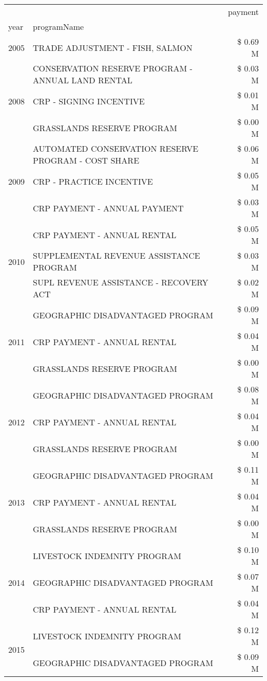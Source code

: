 \begin{tabular}{llr}
\toprule
 &  & payment \\
year & programName &  \\
\midrule
2005 & TRADE ADJUSTMENT - FISH, SALMON & \$ 0.69 M \\
\cline{1-3}
\multirow[t]{3}{*}{2008} & CONSERVATION RESERVE PROGRAM - ANNUAL LAND RENTAL & \$ 0.03 M \\
 & CRP - SIGNING INCENTIVE & \$ 0.01 M \\
 & GRASSLANDS RESERVE PROGRAM & \$ 0.00 M \\
\cline{1-3}
\multirow[t]{3}{*}{2009} & AUTOMATED CONSERVATION RESERVE PROGRAM - COST SHARE & \$ 0.06 M \\
 & CRP - PRACTICE INCENTIVE & \$ 0.05 M \\
 & CRP PAYMENT - ANNUAL PAYMENT & \$ 0.03 M \\
\cline{1-3}
\multirow[t]{3}{*}{2010} & CRP PAYMENT - ANNUAL RENTAL & \$ 0.05 M \\
 & SUPPLEMENTAL REVENUE ASSISTANCE PROGRAM & \$ 0.03 M \\
 & SUPL REVENUE ASSISTANCE - RECOVERY ACT & \$ 0.02 M \\
\cline{1-3}
\multirow[t]{3}{*}{2011} & GEOGRAPHIC DISADVANTAGED PROGRAM & \$ 0.09 M \\
 & CRP PAYMENT - ANNUAL RENTAL & \$ 0.04 M \\
 & GRASSLANDS RESERVE PROGRAM & \$ 0.00 M \\
\cline{1-3}
\multirow[t]{3}{*}{2012} & GEOGRAPHIC DISADVANTAGED PROGRAM & \$ 0.08 M \\
 & CRP PAYMENT - ANNUAL RENTAL & \$ 0.04 M \\
 & GRASSLANDS RESERVE PROGRAM & \$ 0.00 M \\
\cline{1-3}
\multirow[t]{3}{*}{2013} & GEOGRAPHIC DISADVANTAGED PROGRAM & \$ 0.11 M \\
 & CRP PAYMENT - ANNUAL RENTAL & \$ 0.04 M \\
 & GRASSLANDS RESERVE PROGRAM & \$ 0.00 M \\
\cline{1-3}
\multirow[t]{3}{*}{2014} & LIVESTOCK INDEMNITY PROGRAM & \$ 0.10 M \\
 & GEOGRAPHIC DISADVANTAGED PROGRAM & \$ 0.07 M \\
 & CRP PAYMENT - ANNUAL RENTAL & \$ 0.04 M \\
\cline{1-3}
\multirow[t]{3}{*}{2015} & LIVESTOCK INDEMNITY PROGRAM & \$ 0.12 M \\
 & GEOGRAPHIC DISADVANTAGED PROGRAM & \$ 0.09 M \\

\end{tabular}
